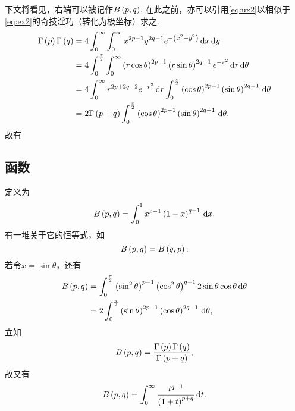 \documentclass[UTF-8]{ctexart}
\begin{document}
  下文将看见，右端可以被记作$B\left(p,q\right)$. 在此之前，亦可以引用\ref{eq:ux2}以相似于\ref{eq:ex2}的奇技淫巧（转化为极坐标）求之.
  \begin{align*}
    \Gamma\left(p\right)\Gamma\left(q\right) &= 4\int_0^\infty \int_0^\infty x^{2p-1}y^{2q-1}e^{-\left(x^2+y^2\right)} \, \mathrm{d} x \, \mathrm{d} y \\
    &= 4 \int_0^{\frac{\pi}{2}} \int_0^\infty \left(r\cos\theta\right)^{2p-1}\left(r\sin\theta\right)^{2q-1}e^{-r^2} \, \mathrm{d} r \,\mathrm{d} \theta \\
    &= 4 \int_0^\infty r^{2p+2q-2}e^{-r^2} \, \mathrm{d} r\int_0^{\frac{\pi}{2}} \left(\cos\theta\right)^{2p-1}\left(\sin\theta\right)^{2q-1} \,\mathrm{d} \theta \\
    &= 2\Gamma\left(p+q\right)\int_0^{\frac{\pi}{2}} \left(\cos\theta\right)^{2p-1}\left(\sin\theta\right)^{2q-1} \,\mathrm{d} \theta.
  \end{align*}
  故有
  \subsection{\titleB 函数}
  定义为
  \[ B\left(p,q\right) = \int_0^{1} x^{p-1}\left(1-x\right)^{q-1} \,\mathrm{d} x. \]
  有一堆关于它的恒等式，如
  \[ B\left(p,q\right) = B\left(q,p\right). \]
  若令$x=\sin\theta$，还有
  \begin{align}
  \label{eq:bsc}
    B\left(p,q\right) &= \int_0^{\frac{\pi}{2}} \left(\sin^2\theta\right)^{p-1}\left(\cos^2\theta\right)^{q-1}2\sin\theta\cos\theta \,\mathrm{d} \theta \\
    &= 2 \int_0^{\frac{\pi}{2}} \left(\sin\theta\right)^{2p-1}\left(\cos\theta\right)^{2q-1} \,\mathrm{d} \theta,
  \end{align}
  立知
  \[ B\left(p,q\right) = \frac{\Gamma\left(p\right)\Gamma\left(q\right)}{\Gamma\left(p+q\right)}, \]
  故又有
  \[ B\left(p,q\right) = \int_0^\infty \frac{t^{q-1}}{\left(1+t\right)^{p+q}} \, \mathrm{d} t. \]
\end{document}
